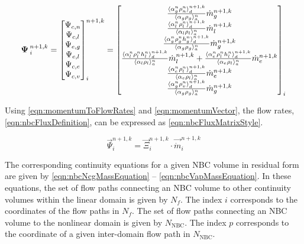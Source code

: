\begin{equation}
\label{eqn:nbcFluxDefinition}
\vec{\Psi}^{n+1, k}_{i} = \begin{bmatrix}
\Psi_{c, n} \\
\Psi_{c, l} \\
\Psi_{e, g} \\
\Psi_{e, l} \\
\Psi_{c, e} \\
\Psi_{c, v} \\
\end{bmatrix}^{n+1, k}_{i} = \begin{bmatrix}
\frac{\don{\alpha^{n}_{g} \rho^{n}_{n}}^{n+1,k}_{d}}{\ave{\alpha_{g} \rho_{g}}^{n}_{a}}\dot{m}^{n+1,k}_{g} \\
%
\frac{\don{\alpha^{n}_{l}\rho^{n}_{l}}^{n+1,k}_{d}}{\ave{\alpha_{l} \rho_{l}}^{n}_{a}}\dot{m}^{n+1,k}_{l}\\
%
\frac{\don{\alpha^{n}_{g} \rho^{n}_{g} h^{n}_{g}}^{n+1,k}_{d}}{\ave{\alpha_{g} \rho_{g}}^{n}_{a}}\dot{m}^{n+1, k}_{g}\\
%
\frac{\don{\alpha^{n}_{l}\rho^{n}_{l} h^{n}_{l}}^{n+1,k}_{d}}{\ave{\alpha_{l} \rho_{l}}^{n}_{a}}\dot{m}^{n+1, k}_{l} +\frac{\don{\alpha^{n}_{e} \rho^{n}_{l} h^{n}_{l}}^{n+1, k}_{d}}{\ave{\alpha_{e} \rho_{l}}^{n}_{a}}\dot{m}^{n+1, k}_{e} \\
%
\frac{ \don{\alpha^{n}_{e} \rho^{n}_{l}}^{n+1, k}_{d}}{ \ave{\alpha_{e} \rho_{l}}^{n}_{a}} \dot{m}^{n+1, k}_{e} \\
%
\frac{ \don{\alpha^{n}_{g} \rho^{n}_{v}}^{n+1, k}_{d}}{ \ave{\alpha_{g} \rho_{g}}^{n}_{a}} \dot{m}^{n+1, k}_{g}
\end{bmatrix}_{i}
\end{equation}

Using \eqref{eqn:momentumToFlowRates} and \eqref{eqn:momentumVector}, the flow rates, \eqref{eqn:nbcFluxDefinition}, can be expressed as \eqref{eqn:nbcFluxMatrixStyle}.

\begin{equation}
\label{eqn:nbcFluxMatrixStyle}
\vec{\Psi}^{n+1, k}_{i} = \vec{\Xi}^{n+1, k}_{i} \cdot \vec{\dot{m}}^{n+1, k}_{i}
\end{equation}

The corresponding continuity equations for a given NBC volume in residual form are given by \eqref{eqn:nbcNcgMassEquation} -- \eqref{eqn:nbcVapMassEquation}.
In these equations, the set of flow paths connecting an NBC volume to other continuity volumes within the linear domain is given by $N_{f}$.
The index $i$ corresponds to the coordinates of the flow paths in $N_{f}$.
The set of flow paths connecting an NBC volume to the nonlinear domain is given by $N_{\text{NBC}}$.
The index $p$ corresponds to the coordinate of a given inter-domain flow path in $N_{\text{NBC}}$.


